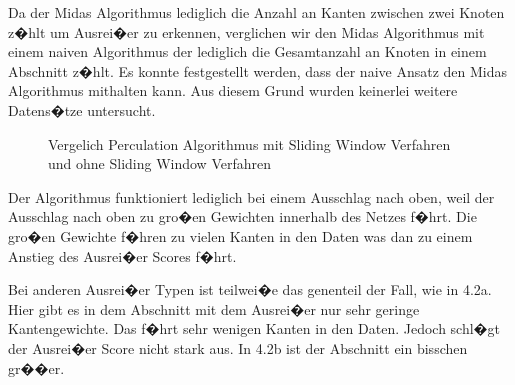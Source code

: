 Da der Midas Algorithmus lediglich die Anzahl an Kanten zwischen zwei Knoten z�hlt um Ausrei�er zu erkennen, verglichen wir den Midas Algorithmus mit einem naiven Algorithmus der lediglich die Gesamtanzahl an Knoten in einem Abschnitt z�hlt. Es konnte festgestellt werden, dass der naive Ansatz den Midas Algorithmus mithalten kann. Aus diesem Grund wurden keinerlei weitere Datens�tze untersucht. 
\label{sec:resultTSwithoutMidas}

\begin{figure}[h]
	\centering
	\caption{Vergelich Perculation Algorithmus mit Sliding Window Verfahren und ohne Sliding Window Verfahren}
	\label{img:midasTSresults}
\end{figure}

Der Algorithmus funktioniert lediglich bei einem Ausschlag nach oben, weil der Ausschlag nach oben zu gro�en Gewichten innerhalb des Netzes f�hrt. Die gro�en Gewichte f�hren zu vielen Kanten in den Daten was dan zu einem Anstieg des Ausrei�er Scores f�hrt.

Bei anderen Ausrei�er Typen ist teilwei�e das genenteil der Fall, wie in 4.2a. Hier gibt es in dem Abschnitt mit dem Ausrei�er nur sehr geringe Kantengewichte. Das f�hrt sehr wenigen Kanten in den Daten. Jedoch schl�gt der Ausrei�er Score nicht stark aus. In 4.2b ist der Abschnitt ein bisschen gr��er.

